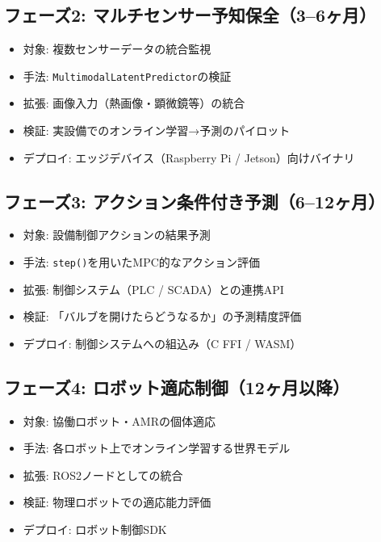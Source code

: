 \documentclass[11pt,a4paper]{ltjsarticle}
\begin{document}
\subsection{フェーズ2: マルチセンサー予知保全（3--6ヶ月）}

\begin{itemize}
  \item 対象: 複数センサーデータの統合監視
  \item 手法: \texttt{MultimodalLatentPredictor}の検証
  \item 拡張: 画像入力（熱画像・顕微鏡等）の統合
  \item 検証: 実設備でのオンライン学習→予測のパイロット
  \item デプロイ: エッジデバイス（Raspberry Pi / Jetson）向けバイナリ
\end{itemize}

\subsection{フェーズ3: アクション条件付き予測（6--12ヶ月）}

\begin{itemize}
  \item 対象: 設備制御アクションの結果予測
  \item 手法: \texttt{step()}を用いたMPC的なアクション評価
  \item 拡張: 制御システム（PLC / SCADA）との連携API
  \item 検証: 「バルブを開けたらどうなるか」の予測精度評価
  \item デプロイ: 制御システムへの組込み（C FFI / WASM）
\end{itemize}

\subsection{フェーズ4: ロボット適応制御（12ヶ月以降）}

\begin{itemize}
  \item 対象: 協働ロボット・AMRの個体適応
  \item 手法: 各ロボット上でオンライン学習する世界モデル
  \item 拡張: ROS2ノードとしての統合
  \item 検証: 物理ロボットでの適応能力評価
  \item デプロイ: ロボット制御SDK
\end{itemize}

\end{document}
